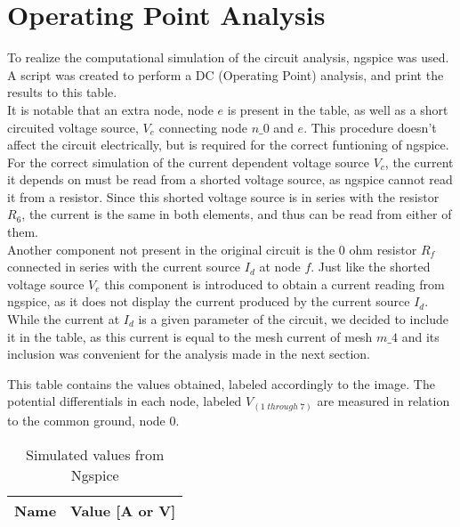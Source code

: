\section{Operating Point Analysis}
\label{sec:simulation}

To realize the computational simulation of the circuit analysis, ngspice was used. A script was created to perform a DC (Operating Point) analysis, and print the results to this table.\\
It is notable that an extra node, node $e$ is present in the table, as well as a short circuited voltage source, $V_{e}$ connecting node $n\_0$ and $e$. This procedure doesn't affect the circuit electrically, but is required for the correct funtioning of ngspice. For the correct simulation of the current dependent voltage source $V_{c}$, the current it depends on must be read from a shorted voltage source, as ngspice cannot read it from a resistor. Since this shorted voltage source is in series with the resistor $R_{6}$, the current is the same in both elements, and thus can be read from either of them.\\
Another component not present in the original circuit is the 0 ohm resistor $R_{f}$ connected in series with the current source $I_{d}$ at node $f$. Just like the shorted voltage source $V_{e}$ this component is introduced to obtain a current reading from ngspice, as it does not display the current produced by the current source $I_{d}$. While the current at $I_{d}$ is a given parameter of the circuit, we decided to include it in the table, as this current is equal to the mesh current of mesh $m\_4$ and its inclusion was convenient for the analysis made in the next section.

This table contains the values obtained, labeled accordingly to the image. The potential differentials in each node, labeled $V_{(1 \; through \; 7)}$ are measured in relation to the common ground, node 0. 


\FloatBarrier
\begin{table}[h]
  \centering
  \begin{tabular}{|l|r|}
    \hline    
    {\bf Name} & {\bf Value [A or V]} \\ \hline
    
  \end{tabular}
  \caption{Simulated values from Ngspice}
  \label{tab:op}
\end{table}
\FloatBarrier


